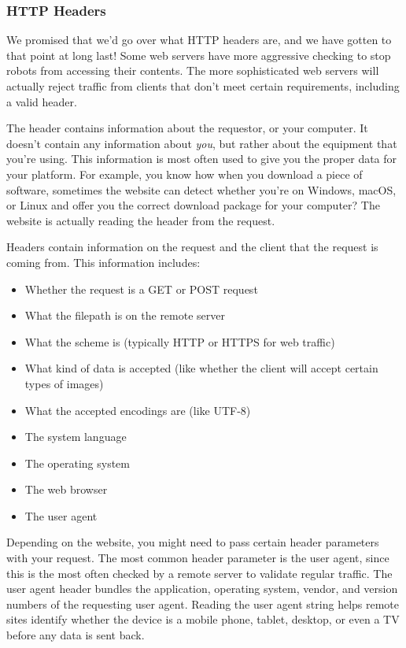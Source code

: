 \subsubsection{HTTP Headers}
We promised that we'd go over what HTTP headers are, and we have gotten to that point at long last! Some web servers have more aggressive checking to stop robots from accessing their contents. The more sophisticated web servers will actually reject traffic from clients that don't meet certain requirements, including a valid header.\par
The header contains information about the requestor, or your computer. It doesn't contain any information about \textit{you}, but rather about the equipment that you're using. This information is most often used to give you the proper data for your platform. For example, you know how when you download a piece of software, sometimes the website can detect whether you're on Windows, macOS, or Linux and offer you the correct download package for your computer? The website is actually reading the header from the request.\par
Headers contain information on the request and the client that the request is coming from. This information includes:
\begin{itemize}
	\item Whether the request is a GET or POST request
	\item What the filepath is on the remote server
	\item What the scheme is (typically HTTP or HTTPS for web traffic)
	\item What kind of data is accepted (like whether the client will accept certain types of images)
	\item What the accepted encodings are (like UTF-8)
	\item The system language
	\item The operating system
	\item The web browser
	\item The user agent
\end{itemize}
Depending on the website, you might need to pass certain header parameters with your request. The most common header parameter is the user agent, since this is the most often checked by a remote server to validate regular traffic. The user agent header bundles the application, operating system, vendor, and version numbers of the requesting user agent. Reading the user agent string helps remote sites identify whether the device is a mobile phone, tablet, desktop, or even a TV before any data is sent back.\par
